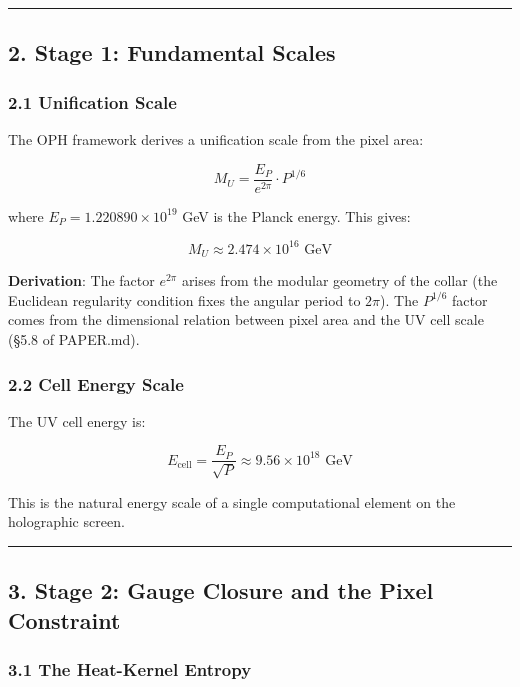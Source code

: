 \begin{center}\rule{0.5\linewidth}{0.5pt}\end{center}

\subsection{2. Stage 1: Fundamental Scales}\label{2-stage-1-fundamental-scales}

\subsubsection{2.1 Unification Scale}\label{21-unification-scale}

The OPH framework derives a unification scale from the pixel area:

\[M_U = \frac{E_P}{e^{2\pi}} \cdot P^{1/6}\]

where \(E_P = 1.220890 \times 10^{19}\) GeV is the Planck energy. This gives:

\[M_U \approx 2.474 \times 10^{16} \text{ GeV}\]

\textbf{Derivation}: The factor \(e^{2\pi}\) arises from the modular geometry of the collar (the Euclidean regularity condition fixes the angular period to \(2\pi\)). The \(P^{1/6}\) factor comes from the dimensional relation between pixel area and the UV cell scale (§5.8 of PAPER.md).

\subsubsection{2.2 Cell Energy Scale}\label{22-cell-energy-scale}

The UV cell energy is:

\[E_{\text{cell}} = \frac{E_P}{\sqrt{P}} \approx 9.56 \times 10^{18} \text{ GeV}\]

This is the natural energy scale of a single computational element on the holographic screen.

\begin{center}\rule{0.5\linewidth}{0.5pt}\end{center}

\subsection{3. Stage 2: Gauge Closure and the Pixel Constraint}\label{3-stage-2-gauge-closure-and-the-pixel-constraint}

\subsubsection{3.1 The Heat-Kernel Entropy}\label{31-the-heat-kernel-entropy}

